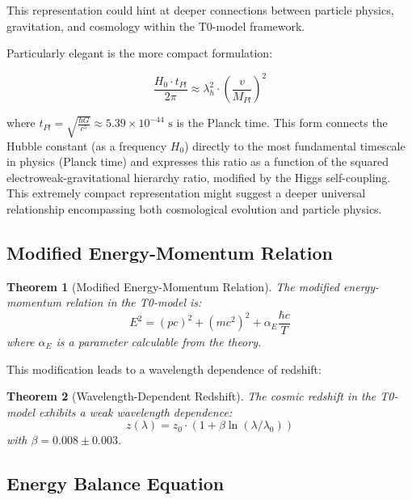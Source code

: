 \documentclass[a4paper,12pt]{article}
\newtheorem{theorem}{Theorem}[section]
\theoremstyle{definition}
\theoremstyle{remark}
\begin{document}
	This representation could hint at deeper connections between particle physics, gravitation, and cosmology within the T0-model framework.
	
	Particularly elegant is the more compact formulation:
	
	\begin{equation}
		\frac{H_0 \cdot t_{Pl}}{2\pi} \approx \lambda_h^2 \cdot \left(\frac{v}{M_{Pl}}\right)^2
	\end{equation}
	
	where \(t_{Pl} = \sqrt{\frac{\hbar G}{c^5}} \approx 5.39 \times 10^{-44} \text{ s}\) is the Planck time. This form connects the Hubble constant (as a frequency \(H_0\)) directly to the most fundamental timescale in physics (Planck time) and expresses this ratio as a function of the squared electroweak-gravitational hierarchy ratio, modified by the Higgs self-coupling. This extremely compact representation might suggest a deeper universal relationship encompassing both cosmological evolution and particle physics.
	
	\subsection{Modified Energy-Momentum Relation}
	
	\begin{theorem}[Modified Energy-Momentum Relation]
		The modified energy-momentum relation in the T0-model is:
		\begin{equation}
			E^2 = (pc)^2 + (mc^2)^2 + \alpha_E\frac{\hbar c}{T}
		\end{equation}
		where \(\alpha_E\) is a parameter calculable from the theory.
	\end{theorem}
	
	This modification leads to a wavelength dependence of redshift:
	
	\begin{theorem}[Wavelength-Dependent Redshift]
		The cosmic redshift in the T0-model exhibits a weak wavelength dependence:
		\begin{equation}
			z(\lambda) = z_0 \cdot (1 + \beta\ln(\lambda/\lambda_0))
		\end{equation}
		with \(\beta = 0.008 \pm 0.003\).
	\end{theorem}
	
	\subsection{Energy Balance Equation}
	
\end{document}
